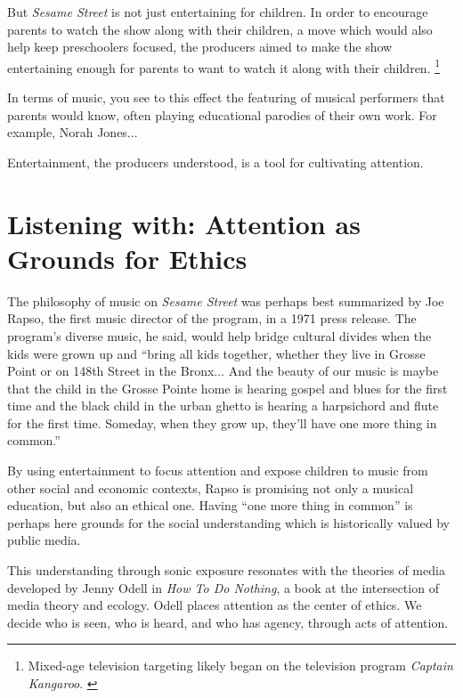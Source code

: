 \documentclass[12pt,letterpaper]{article}
\begin{document}
	But \textit{Sesame Street} is not just entertaining for children. 
	In order to encourage parents to watch the show along with their
	children, a move which would also help keep preschoolers focused,
	the producers aimed to make the show entertaining enough for parents
	to want to watch it along with their children.
	\autocite[294]{Ostrofsky2017}
	\footnote{Mixed-age television targeting likely began on the 
	television program \textit{Captain Kangaroo}. \autocite[46]{Davis}} 
	
	In terms of music, you see to this effect the featuring of musical 
	performers that parents would know, often playing educational parodies 
	of their own work. For example, Norah Jones...
		
	Entertainment, the producers understood, is a tool for
	cultivating attention.
	

	\section*{Listening with: Attention as Grounds for Ethics}	

	The philosophy of music on \textit{Sesame Street} was perhaps best 
	summarized by Joe Rapso, the first music director of the program, in a
	1971 press release. The program's diverse music, he said, would
	help bridge cultural divides when the kids were grown up and ``bring all
	kids together, whether they live in Grosse Point or on 148th Street in 
	the Bronx... And the beauty of our music is maybe that the child in the
	Grosse Pointe home is hearing gospel and blues for the first time and 
	the black child in the urban ghetto is hearing a harpsichord and flute 
	for the first time. Someday, when they grow up, they'll have one more 
	thing in common.''\autocite[297]{Ostrofsky2012}

	By using entertainment to focus attention and expose children to music 
	from other social and economic contexts,
	Rapso is promising not only a musical education, but also an ethical 
	one. Having ``one more thing in common'' is perhaps here grounds for 
	the social understanding which is historically valued by public media.  

	This understanding through sonic exposure resonates with the theories 
	of media developed by Jenny Odell in 
	\textit{How To Do Nothing}, a book at the intersection of media theory
	and ecology. Odell places attention as the center of ethics. We decide 
	who is seen, who is heard, and who has agency, through acts of 
	attention. \autocite[154]{Odell}
\end{document}
